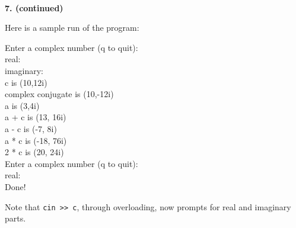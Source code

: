 \documentclass[10 pt]{amsart}
\newlength{\cwidth}
\newenvironment{cpartContinued}[2][\cwidth]
	{%
		\\ %
		\textbf{#2. (continued)}%
		\\
		\phantom{#2. }
		\begin{minipage}[t]{#1}%
		\setlength{\parindent}{0pt}%
		\setlength{\parskip}{2ex}%
	}
	{%
		\end{minipage}%
	}
\newcommand{\ttt}[1]{\texttt{#1}}
\newcommand{\ttb}[1]{\pmb{\texttt{#1}}}
\begin{document}
	\begin{cpartContinued}{7}
		Here is a sample run of the program:
		
		{\ttfamily
			Enter a complex number (q to quit): \\
			real:\ttb{ 10} \\
			imaginary:\ttb{ 12} \\
			c is (10,12i) \\
			complex conjugate is (10,-12i) \\
			a is (3,4i) \\
			a + c is (13, 16i) \\
			a - c is (-7, 8i) \\
			a * c is (-18, 76i) \\
			2 * c is (20, 24i) \\
			Enter a complex number (q to quit): \\
			real:\ttb{ q} \\
			Done!
		}

		Note that \ttt{cin >> c}, through overloading, now 
		prompts for real and imaginary parts.
	\end{cpartContinued}
\end{document}
